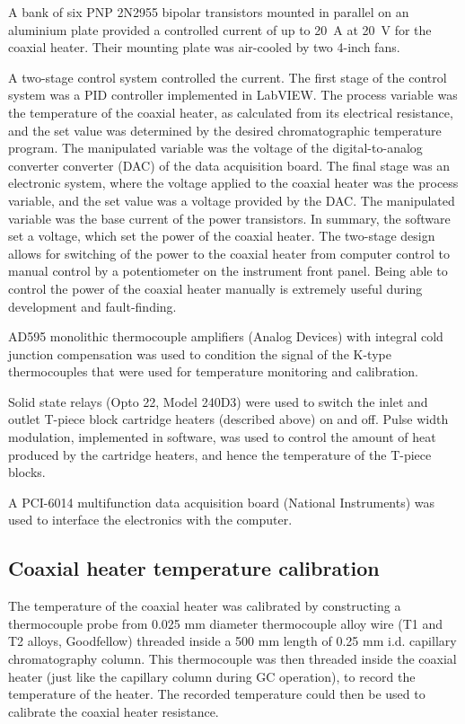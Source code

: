 \documentclass[aip,rsi,preprint,graphicx]{revtex4-1} %
\begin{document}
A bank of six PNP 2N2955 bipolar transistors mounted in parallel on an aluminium
plate provided a controlled current of up to \SI{20}{\ampere} at \SI{20}{\volt}
for the coaxial heater. Their mounting plate was air-cooled by two 4-inch fans.

A two-stage control system controlled the current. The first stage of the
control system was a PID controller implemented in LabVIEW. The process variable
was the temperature of the coaxial heater, as calculated from its electrical
resistance, and the set value was determined by the desired chromatographic
temperature program. The manipulated variable was the voltage of the
digital-to-analog converter converter (DAC) of the data acquisition board. The
final stage was an electronic system, where the voltage applied to the coaxial
heater was the process variable, and the set value was a voltage provided by the
DAC. The manipulated variable was the base current of the power transistors.
In summary, the software set a voltage, which set the power of the coaxial
heater. The two-stage design allows for switching of the power to the coaxial
heater from computer control to manual control by a potentiometer on the
instrument front panel. Being able to control the power of the coaxial heater
manually is extremely useful during development and fault-finding.

AD595 monolithic thermocouple amplifiers (Analog Devices) with integral cold
junction compensation was used to condition the signal of the K-type
thermocouples that were used for temperature monitoring and calibration.

Solid state relays (Opto 22, Model 240D3) were used to switch the inlet and
outlet T-piece block cartridge heaters (described above) on and off. Pulse width
modulation, implemented in software, was used to control the amount of heat
produced by the cartridge heaters, and hence the temperature of the T-piece blocks. 

A PCI-6014 multifunction data acquisition board (National
Instruments\texttrademark{}) was used to interface the electronics with the
computer.

\subsection{Coaxial heater temperature calibration}

The temperature of the coaxial heater was calibrated by constructing a
thermocouple probe from 0.025 mm diameter thermocouple alloy wire (T1 and T2
alloys, Goodfellow) threaded inside a 500 mm length of 0.25 mm i.d.
capillary chromatography column. This thermocouple was then threaded inside the
coaxial heater (just like the capillary column during GC operation), to record
the temperature of the heater. The recorded temperature could then be used to
calibrate the coaxial heater resistance.
\end{document}
